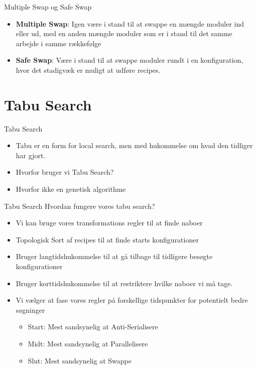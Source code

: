 \begin{frame}{Multiple Swap og Safe Swap}
	\begin{itemize}
		\item \textbf{Multiple Swap}: Igen være i stand til at swappe en mængde moduler ind eller ud, med en anden mængde moduler som er i stand til det samme arbejde i samme rækkefølge
		\item \textbf{Safe Swap}: Være i stand til at swappe moduler rundt i en konfiguration, hvor det stadigvæk er muligt at udføre recipes.
	\end{itemize}
\end{frame}



\section{Tabu Search}
\begin{frame} {Tabu Search}
	\begin{itemize}
		\item Tabu er en form for local search, men med hukommelse om hvad den tidliger har gjort.
		\item Hvorfor bruger vi Tabu Search?
		\item Hvorfor ikke en genetisk algorithme
	\end{itemize}
\end{frame}

\begin{frame} {Tabu Search}
	Hvordan fungere vores tabu search?
	\begin{itemize}
		\item Vi kan bruge vores transformations regler til at finde naboer
		\item Topologisk Sort af recipes til at finde starts konfigurationer
		\item Bruger langtidshukommelse til at gå tilbage til tidligere besøgte konfigurationer
		\item Bruger korttidshukommelse til at restriktere hvilke naboer vi må tage.
		\item Vi vælger at fase vores regler på forskellige tidspunkter for potentielt bedre søgninger
		\begin{itemize}
			\item Start: Mest sandsynelig at Anti-Serialisere
			\item Midt: Mest sandsynelig at Parallelisere
			\item Slut: Mest sandsynelig at Swappe
		\end{itemize}
	\end{itemize}
\end{frame}

